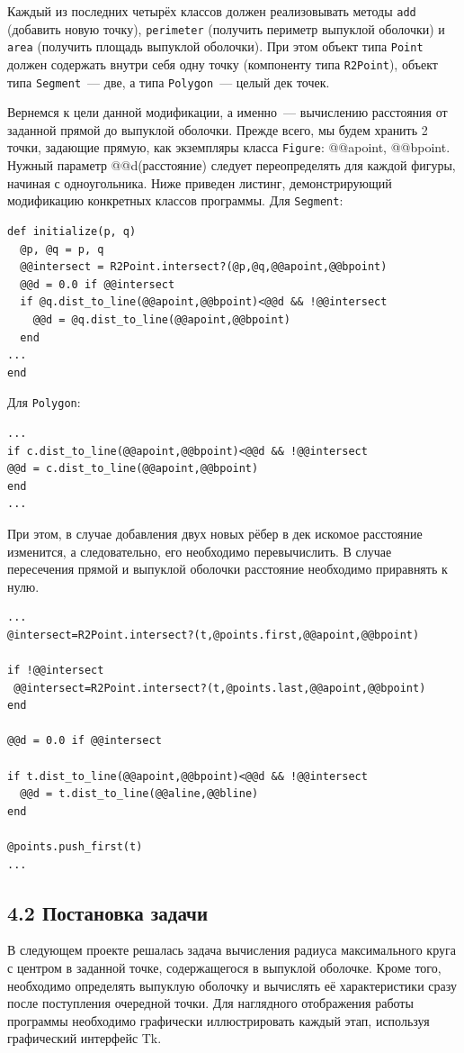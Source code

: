 Каждый из последних четырёх классов должен реализовывать методы \verb|add| (добавить новую точку),
\verb|perimeter| (получить периметр выпуклой оболочки) и \verb|area| (получить площадь выпуклой оболочки).
 При этом объект типа \verb|Point| должен содержать внутри себя одну точку (компоненту
  типа \verb|R2Point|), объект типа \verb|Segment|~--- две, а типа \verb|Polygon|~--- целый дек точек.

Вернемся к цели данной модификации, а именно~--- вычислению расстояния
 от заданной прямой до выпуклой оболочки. Прежде всего, мы будем хранить 2 точки,
  задающие прямую, как экземпляры класса \verb|Figure|: @@apoint, @@bpoint.
   Нужный параметр @@d(расстояние) следует переопределять для каждой фигуры,
    начиная с одноугольника. Ниже приведен листинг, демонстрирующий модификацию конкретных
     классов программы.
Для \verb|Segment|:
\begin{lstlisting}
def initialize(p, q)
  @p, @q = p, q
  @@intersect = R2Point.intersect?(@p,@q,@@apoint,@@bpoint)
  @@d = 0.0 if @@intersect
  if @q.dist_to_line(@@apoint,@@bpoint)<@@d && !@@intersect
    @@d = @q.dist_to_line(@@apoint,@@bpoint)
  end
...
end
\end{lstlisting}

Для \verb|Polygon|:
\begin{lstlisting}
...
if c.dist_to_line(@@apoint,@@bpoint)<@@d && !@@intersect
@@d = c.dist_to_line(@@apoint,@@bpoint)
end
...
\end{lstlisting}

При этом, в случае добавления двух новых рёбер в дек искомое расстояние изменится,
 а следовательно, его необходимо перевычислить. В случае пересечения прямой и
 выпуклой оболочки расстояние необходимо приравнять к нулю.
\begin{lstlisting}
...
@intersect=R2Point.intersect?(t,@points.first,@@apoint,@@bpoint)

if !@@intersect
 @@intersect=R2Point.intersect?(t,@points.last,@@apoint,@@bpoint)
end

@@d = 0.0 if @@intersect

if t.dist_to_line(@@apoint,@@bpoint)<@@d && !@@intersect
  @@d = t.dist_to_line(@@aline,@@bline)
end

@points.push_first(t)
...
\end{lstlisting}


\subsection*{4.2 Постановка задачи}
В следующем проекте решалась задача вычисления радиуса максимального круга с
центром в заданной точке, содержащегося в выпуклой оболочке. Кроме того, необходимо
определять выпуклую оболочку и вычислять её характеристики сразу
после поступления очередной точки.
Для наглядного отображения работы программы необходимо
графически иллюстрировать каждый этап, используя графический интерфейс Tk.
